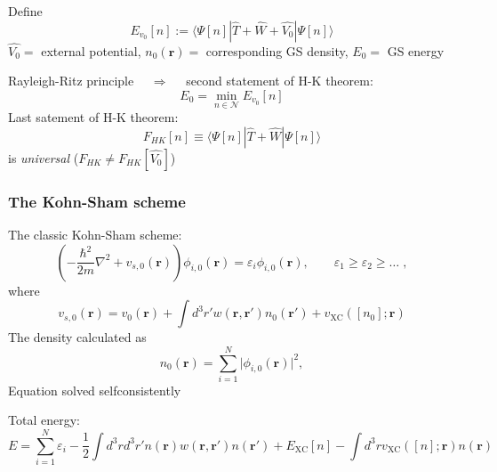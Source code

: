 \documentclass[compress]{beamer}
\newcommand*{\ket}[1]{|#1\rangle}
\newcommand*{\bra}[1]{\langle#1|}
\begin{document}
\frame
{ 
\frametitle{}
\begin{small}
{\scriptsize
    
Define
\begin{equation}
  E_{v_{0}}[n]:=\bra{\Psi[n]}\hat{T}+\hat{W}+\hat{V_{0}}\ket{\Psi[n]} \nonumber
\end{equation}
$\hat{V_{0}} =$ external potential, $n_{0}(\mathbf{r}) =$ corresponding GS density, $E_{0} =$ GS energy

\vspace{2mm}
Rayleigh-Ritz principle $\quad \Longrightarrow \quad $ \alert{second statement of H-K theorem}:
\begin{equation}
  E_{0}=\min_{n\in \mathcal{N}}E_{v_{0}}[n] \nonumber
\end{equation}
\alert{Last satement of H-K theorem}:
\begin{equation}
  F_{HK}[n]\equiv \bra{\Psi[n]}\hat{T}+\hat{W}\ket{\Psi[n]} \nonumber
\end{equation}
is \emph{universal} ($F_{HK}\neq F_{HK}[\hat{V_{0}}]$)
} 
\end{small}
}



\frame
{ 
  \frametitle{The Kohn-Sham scheme }
  \begin{small}
    {\scriptsize
      The \alert{classic Kohn-Sham} scheme:
      \begin{equation}
         \left(-\frac{\hbar^{2}}{2m}\nabla^{2}+v_{s,0}(\mathbf{r})\right)\phi_{i,0}(\mathbf{r})=\varepsilon_{i}\phi_{i,0}(\mathbf{r}), \qquad \varepsilon_{1}\geq \varepsilon_{2} \geq \dots \;, \nonumber
      \end{equation}
      where
      \begin{equation}
        v_{s,0}(\mathbf{r})=v_{0}(\mathbf{r})+\int d^{3}r' w(\mathbf{r},\mathbf{r}')n_{0}(\mathbf{r}')+v_{\mathrm{XC}}([n_{0}];\mathbf{r}) \nonumber 
      \end{equation}
      The density calculated as 
      \begin{equation}
        n_{0}(\mathbf{r})=\sum_{i=1}^{N}\vert \phi_{i,0}(\mathbf{r})\vert^{2}, \nonumber
      \end{equation}
      Equation \alert{solved selfconsistently} 

      Total energy: 
      \begin{equation}
        E=\sum_{i=1}^{N}\varepsilon_{i}-\frac{1}{2}\int d^{3}r d^{3}r'n(\mathbf{r})w(\mathbf{r},\mathbf{r}')n(\mathbf{r}')+E_{\mathrm{XC}}[n]-\int d^{3}r v_{\mathrm{XC}}([n];\mathbf{r})n(\mathbf{r}) \nonumber
      \end{equation}
    }
  \end{small}
}
\end{document}
